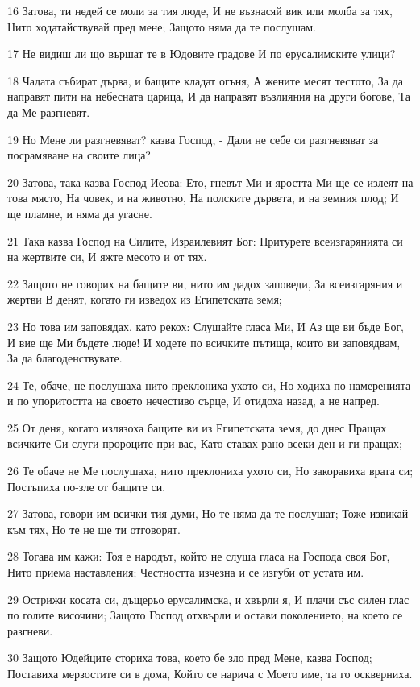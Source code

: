 \par 16 Затова, ти недей се моли за тия люде, И не възнасяй вик или молба за тях, Нито ходатайствувай пред мене; Защото няма да те послушам.
\par 17 Не видиш ли що вършат те в Юдовите градове И по ерусалимските улици?
\par 18 Чадата събират дърва, и бащите кладат огъня, А жените месят тестото, За да направят пити на небесната царица, И да направят възлияния на други богове, Та да Ме разгневят.
\par 19 Но Мене ли разгневяват? казва Господ, - Дали не себе си разгневяват за посрамяване на своите лица?
\par 20 Затова, така казва Господ Иеова: Ето, гневът Ми и яростта Ми ще се излеят на това място, На човек, и на животно, На полските дървета, и на земния плод; И ще пламне, и няма да угасне.
\par 21 Така казва Господ на Силите, Израилевият Бог: Притурете всеизгарянията си на жертвите си, И яжте месото и от тях.
\par 22 Защото не говорих на бащите ви, нито им дадох заповеди, За всеизгаряния и жертви В денят, когато ги изведох из Египетската земя;
\par 23 Но това им заповядах, като рекох: Слушайте гласа Ми, И Аз ще ви бъде Бог, И вие ще Ми бъдете люде! И ходете по всичките пътища, които ви заповядвам, За да благоденствувате.
\par 24 Те, обаче, не послушаха нито преклониха ухото си, Но ходиха по намеренията и по упоритостта на своето нечестиво сърце, И отидоха назад, а не напред.
\par 25 От деня, когато излязоха бащите ви из Египетската земя, до днес Пращах всичките Си слуги пророците при вас, Като ставах рано всеки ден и ги пращах;
\par 26 Те обаче не Ме послушаха, нито преклониха ухото си, Но закоравиха врата си; Постъпиха по-зле от бащите си.
\par 27 Затова, говори им всички тия думи, Но те няма да те послушат; Тоже извикай към тях, Но те не ще ти отговорят.
\par 28 Тогава им кажи: Тоя е народът, който не слуша гласа на Господа своя Бог, Нито приема наставления; Честността изчезна и се изгуби от устата им.
\par 29 Острижи косата си, дъщерьо ерусалимска, и хвърли я, И плачи със силен глас по голите височини; Защото Господ отхвърли и остави поколението, на което се разгневи.
\par 30 Защото Юдейците сториха това, което бе зло пред Мене, казва Господ; Поставиха мерзостите си в дома, Който се нарича с Моето име, та го оскверниха.
